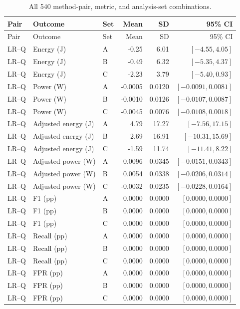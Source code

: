 \footnotesize\setlength{\tabcolsep}{4pt}\begin{longtable}{lllrrr}
\caption{All 540 method-pair, metric, and analysis-set combinations.}\label{tab:allpairs}\\
\toprule Pair & Outcome & Set & Mean & SD & 95\% CI\\\midrule\endfirsthead
\toprule Pair & Outcome & Set & Mean & SD & 95\% CI\\\midrule\endhead
\bottomrule\endfoot
LR--Q & Energy (J) & A & -0.25 & 6.01 & $[-4.55,4.05]$\\
LR--Q & Energy (J) & B & -0.49 & 6.32 & $[-5.35,4.37]$\\
LR--Q & Energy (J) & C & -2.23 & 3.79 & $[-5.40,0.93]$\\
LR--Q & Power (W) & A & -0.0005 & 0.0120 & $[-0.0091,0.0081]$\\
LR--Q & Power (W) & B & -0.0010 & 0.0126 & $[-0.0107,0.0087]$\\
LR--Q & Power (W) & C & -0.0045 & 0.0076 & $[-0.0108,0.0018]$\\
LR--Q & Adjusted energy (J) & A & 4.79 & 17.27 & $[-7.56,17.15]$\\
LR--Q & Adjusted energy (J) & B & 2.69 & 16.91 & $[-10.31,15.69]$\\
LR--Q & Adjusted energy (J) & C & -1.59 & 11.74 & $[-11.41,8.22]$\\
LR--Q & Adjusted power (W) & A & 0.0096 & 0.0345 & $[-0.0151,0.0343]$\\
LR--Q & Adjusted power (W) & B & 0.0054 & 0.0338 & $[-0.0206,0.0314]$\\
LR--Q & Adjusted power (W) & C & -0.0032 & 0.0235 & $[-0.0228,0.0164]$\\
LR--Q & F1 (pp) & A & 0.0000 & 0.0000 & $[0.0000,0.0000]$\\
LR--Q & F1 (pp) & B & 0.0000 & 0.0000 & $[0.0000,0.0000]$\\
LR--Q & F1 (pp) & C & 0.0000 & 0.0000 & $[0.0000,0.0000]$\\
LR--Q & Recall (pp) & A & 0.0000 & 0.0000 & $[0.0000,0.0000]$\\
LR--Q & Recall (pp) & B & 0.0000 & 0.0000 & $[0.0000,0.0000]$\\
LR--Q & Recall (pp) & C & 0.0000 & 0.0000 & $[0.0000,0.0000]$\\
LR--Q & FPR (pp) & A & 0.0000 & 0.0000 & $[0.0000,0.0000]$\\
LR--Q & FPR (pp) & B & 0.0000 & 0.0000 & $[0.0000,0.0000]$\\
LR--Q & FPR (pp) & C & 0.0000 & 0.0000 & $[0.0000,0.0000]$\\

\end{longtable}
